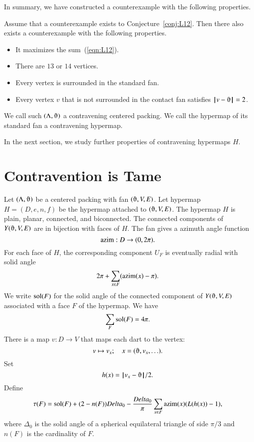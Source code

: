 In summary, we have constructed a counterexample with the following properties.

\begin{lemma}\label{lemma:CE} 
Assume that a counterexample exists to Conjecture~\ref{conj:L12}.  Then there also exists a counterexample with the following properties.
\begin{itemize}
\item It maximizes the sum~(\ref{eqn:L12}).
\item There are $13$ or $14$ vertices.
\item Every vertex is surrounded in the standard fan.
\item Every vertex $v$ that is not surrounded in the contact
fan satisfies $\norm{v}{\orgn}=2$.
\end{itemize}
\end{lemma}





\begin{definition}
We call such $(\Lambda,\orgn)$ a contravening centered packing.  We
call the hypermap of its standard fan a contravening hypermap.
\end{definition}


In the next section, we study further properties of contravening hypermaps $H$.



\section{Contravention is Tame}
    \label{sec:contraproof}

Let $(\Lambda,\orgn)$ be a centered packing with
fan $(\orgn,V,E)$.  Let  hypermap $H=(D,e,n,f)$
be the hypermap attached to $(\orgn,V,E)$.
The hypermap $H$ is plain, planar, connected, and biconnected.
The connected components of $Y(\orgn,V,E)$ are in bijection with
faces of $H$.  
The fan gives a azimuth angle function
$$
{\operatorname{azim}} : D \to (0,2\pi).
$$
For each face of $H$, the corresponding component $U_F$
is eventually radial with solid
angle
  $$
  2\pi + \sum_{x\in F} ({\operatorname{azim}}(x) -\pi).
  $$
We write $\operatorname{sol}(F)$ for the solid angle of the connected component
of $Y(\orgn,V,E)$ associated with a face $F$ of the hypermap.
We have
    $$\sum_{F} \operatorname{sol}(F) = 4\pi.$$
There is a map $v:D\to V$ that maps each dart to the vertex:
$$
v \mapsto v_x; \quad   x = (\orgn,v_x,\ldots).
$$
Set 
$$h(x) = \norm{v_x}{\orgn}/2.$$
Define
$$\tau(F) = \operatorname{sol}(F) + (2- n(F))Delta_0 - \frac{Delta_0}{\pi}\sum_{x\in F}{\operatorname{azim}}(x) (L(h(x)) - 1),
$$
where $\Delta_0$ is the solid angle of a spherical equilateral triangle of side $\pi/3$ and $n(F)$ is the cardinality of $F$.

